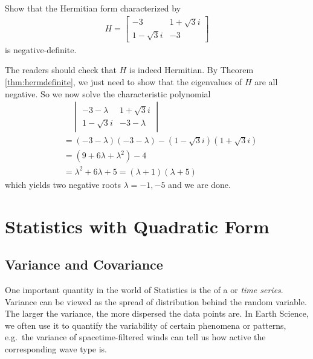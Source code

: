 \begin{exmp}
Show that the Hermitian form characterized by
\begin{align*}
H =
\begin{bmatrix}
-3 & 1+\sqrt{3}i\\ 
1-\sqrt{3}i & -3
\end{bmatrix}
\end{align*}
is negative-definite.
\end{exmp}
\begin{solution}
The readers should check that $H$ is indeed Hermitian. By Theorem \ref{thm:hermdefinite}, we just need to show that the eigenvalues of $H$ are all negative. So we now solve the characteristic polynomial
\begin{align*}
&\quad \begin{vmatrix}
-3-\lambda & 1+\sqrt{3}i\\ 
1-\sqrt{3}i & -3-\lambda
\end{vmatrix} \\
&= (-3-\lambda)(-3-\lambda) - (1-\sqrt{3}i)(1+\sqrt{3}i) \\
&= (9 + 6\lambda + \lambda^2) - 4 \\
&= \lambda^2 + 6\lambda + 5 = (\lambda + 1)(\lambda + 5)
\end{align*}
which yields two negative roots $\lambda = -1, -5$ and we are done.
\end{solution}

\section{Statistics with Quadratic Form}

\subsection{Variance and Covariance}
\label{section:variancesec}
One important quantity in the world of Statistics is the  of a  or \textit{time series}. Variance can be viewed as the spread of distribution behind the random variable. The larger the variance, the more dispersed the data points are. In Earth Science, we often use it to quantify the variability of certain phenomena or patterns, e.g.\ the variance of spacetime-filtered winds can tell us how active the corresponding wave type is.

